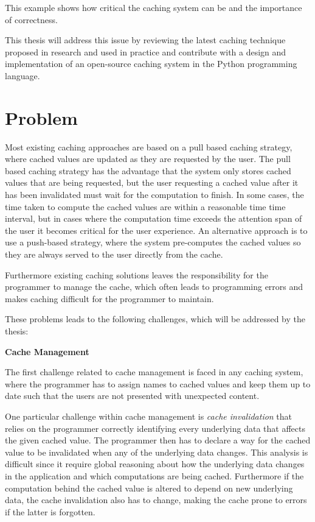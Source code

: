 This example shows how critical the caching system can be and the importance of correctness.

This thesis will address this issue by reviewing the latest caching technique proposed in research and used in practice and contribute with a design and implementation of an open-source caching system in the Python programming language.

\section{Problem}
\label{sec:problem}

Most existing caching approaches are based on a pull based caching strategy, where cached values are updated as they are requested by the user. The pull based caching strategy has the advantage that the system only stores cached values that are being requested, but the user requesting a cached value after it has been invalidated must wait for the computation to finish. In some cases, the time taken to compute the cached values are within a reasonable time time interval, but in cases where the computation time exceeds the attention span of the user it becomes critical for the user experience. An alternative approach is to use a push-based strategy, where the system pre-computes the cached values so they are always served to the user directly from the cache.

Furthermore existing caching solutions leaves the responsibility for the programmer to manage the cache, which often leads to programming errors and makes caching difficult for the programmer to maintain.

These problems leads to the following challenges, which will be addressed by the thesis:

\textbf{Cache Management}

The first challenge related to cache management is faced in any caching system, where the programmer has to assign names to cached values and keep them up to date such that the users are not presented with unexpected content.

One particular challenge within cache management is \emph{cache invalidation} that relies on the programmer correctly identifying every underlying data that affects the given cached value. The programmer then has to declare a way for the cached value to be invalidated when any of the underlying data changes. This analysis is difficult since it require global reasoning about how the underlying data changes in the application and which computations are being cached. Furthermore if the computation behind the cached value is altered to depend on new underlying data, the cache invalidation also has to change, making the cache prone to errors if the latter is forgotten.

